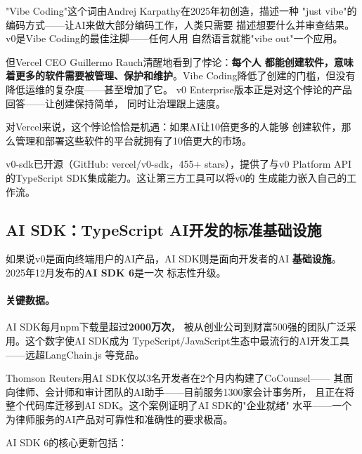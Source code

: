 \begin{whybox}
"Vibe Coding"这个词由Andrej Karpathy在2025年初创造，描述一种
"just vibe"的编码方式——让AI来做大部分编码工作，人类只需要
描述想要什么并审查结果。v0是Vibe Coding的最佳注脚——任何人用
自然语言就能"vibe out"一个应用。

但Vercel CEO Guillermo Rauch清醒地看到了悖论：\textbf{每个人
都能创建软件，意味着更多的软件需要被管理、保护和维护}。Vibe
Coding降低了创建的门槛，但没有降低运维的复杂度——甚至增加了它。
v0 Enterprise版本正是对这个悖论的产品回答——让创建保持简单，
同时让治理跟上速度。

对Vercel来说，这个悖论恰恰是机遇：如果AI让10倍更多的人能够
创建软件，那么管理和部署这些软件的平台就拥有了10倍更大的市场。
\end{whybox}

v0-sdk已开源（GitHub: vercel/v0-sdk，455+ stars），提供了与v0
Platform API的TypeScript SDK集成能力。这让第三方工具可以将v0的
生成能力嵌入自己的工作流。

\subsection{AI SDK：TypeScript AI开发的标准基础设施}
\label{subsec:ai-sdk}

如果说v0是面向终端用户的AI产品，AI SDK则是面向开发者的AI
\textbf{基础设施}。2025年12月发布的\textbf{AI SDK 6}是一次
标志性升级。

\paragraph{关键数据。}AI SDK每月npm下载量超过\textbf{2000万次}，
被从创业公司到财富500强的团队广泛采用。这个数字使AI SDK成为
TypeScript/JavaScript生态中最流行的AI开发工具——远超LangChain.js
等竞品。

Thomson Reuters用AI SDK仅以3名开发者在2个月内构建了CoCounsel——
其面向律师、会计师和审计团队的AI助手——目前服务1300家会计事务所，
且正在将整个代码库迁移到AI SDK。这个案例证明了AI SDK的"企业就绪"
水平——一个为律师服务的AI产品对可靠性和准确性的要求极高。

AI SDK 6的核心更新包括：

